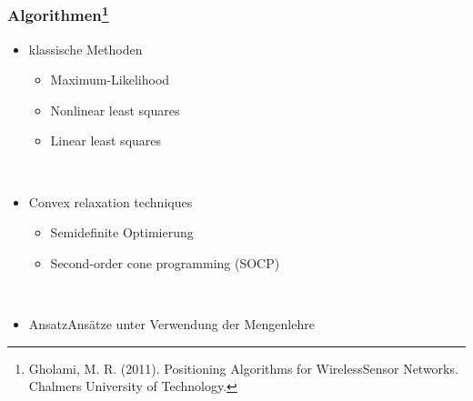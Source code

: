 \begin{frame}
  \frametitle{Algorithmen\footnote{Gholami, M. R. (2011). Positioning Algorithms for
      WirelessSensor Networks. Chalmers University of Technology.}}

  \begin{itemize}
  \item klassische Methoden
    \begin{itemize}
    \item Maximum-Likelihood
    \item Nonlinear least squares
    \item Linear least squares
    \end{itemize}
  ~\\
  \item Convex relaxation techniques
    \begin{itemize}
    \item Semidefinite Optimierung
    \item Second-order cone programming (SOCP)
    \end{itemize}
  ~\\
  \item AnsatzAnsätze unter Verwendung der Mengenlehre
  \end{itemize}
\end{frame}
